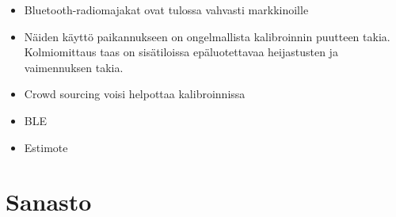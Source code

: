 \documentclass[a4paper]{scrartcl}
\begin{document}
\cite{zhu2012improving}

\begin{itemize}
	\item Bluetooth-radiomajakat ovat tulossa vahvasti markkinoille
	\item Näiden käyttö paikannukseen on ongelmallista kalibroinnin puutteen
		takia. Kolmiomittaus taas on sisätiloissa epäluotettavaa heijastusten
		ja vaimennuksen takia.
	\item Crowd sourcing voisi helpottaa kalibroinnissa
	\item BLE
	\item Estimote
\end{itemize}

\section{Sanasto}

\glsaddall
\printglossary
\glsaddall
\printglossary[type=\acronymtype,title=Lyhenteet]



\end{document}
